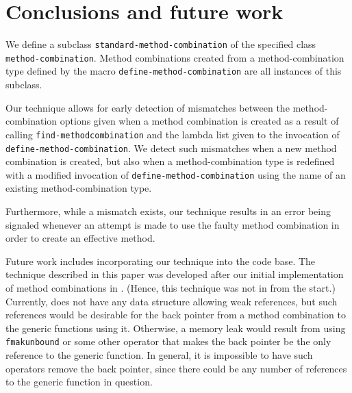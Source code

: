 \section{Conclusions and future work}
\label{sec-conclusions}

We define a subclass \texttt{standard-method-combination} of the
specified class \texttt{method-combination}.  Method combinations
created from a method-combination type defined by the macro
\texttt{define-method-combination} are all instances of this subclass.

Our technique allows for early detection of mismatches between the
method-combination options given when a method combination is created
as a result of calling \texttt{find-method\-combination} and the lambda
list given to the invocation of \texttt{define-method-combination}.
We detect such mismatches when a new method combination is created,
but also when a method-combination type is redefined with a modified
invocation of \texttt{define-method-combination} using the name
of an existing method-combination type.

Furthermore, while a mismatch exists, our technique results in an
error being signaled whenever an attempt is made to use the faulty
method combination in order to create an effective method.

Future work includes incorporating our technique into the \sicl{} code
base.  The technique described in this paper was developed after our
initial implementation of method combinations in \sicl{}.  (Hence,
this technique was not in \sicl{} from the start.)  Currently, \sicl{}
does not have any data structure allowing weak references, but such
references would be desirable for the back pointer from a method
combination to the generic functions using it.  Otherwise, a memory
leak would result from using \texttt{fmakunbound} or some other
operator that makes the back pointer be the only reference to the
generic function.  In general, it is impossible to have such operators
remove the back pointer, since there could be any number of references
to the generic function in question.
